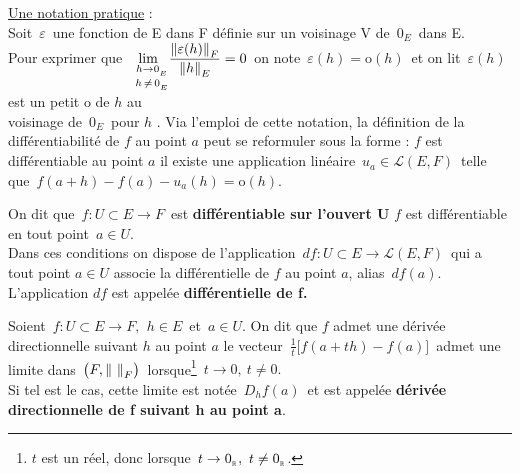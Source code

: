 \underline{Une notation pratique} : \vspace{0.2cm}\\
Soit $\,\varepsilon\,$ une fonction de E dans F définie sur un voisinage V de $\,0_E\,$ dans E.\vspace{0.1cm}\\
Pour exprimer que \(\displaystyle \lim_{\ \; \substack{\vspace{0.05cm}h\to 0_{_E} \\ h\,\neq\, 0_{_E}}}\!\frac{\norm{\varepsilon(h)}_F}{\norm{h}_E}=0\,\) on note \(\,\varepsilon(h)=\mathrm{o}(h)\,\) et on lit \guillemetleft $\,\varepsilon(h)$ est un petit o de $h$ au\vspace{0.3cm}\\
voisinage de $\,0_E\,$ pour $h\,$\guillemetright \,. Via l'emploi de cette notation, la définition de la différentiabilité de $f$ au point $a$ peut se reformuler sous la forme : $f$ est différentiable au point $a$ \ssi il existe une application linéaire \(\,u_a\in\mathscr{L}(E,F)\,\) telle que \(\,f(a+h)-f(a)-u_a(h)=\mathrm{o}(h).\)

\newpage

On dit que \(\,f:U\!\subset\! E\to F\,\) est \textbf{différentiable sur l'ouvert U} \ssi $f$ est différentiable en tout point \(\,a\in U.\)\\
Dans ces conditions on dispose de l'application \(\,df:U\!\subset\! E\to \mathscr{L}(E,F)\,\) qui a tout point $a\in U$ associe la différentielle de $f$ au point $a$, alias \(\,df(a).\)\\
L'application $df$ est appelée \textbf{différentielle de f.}

\vspace{1.5cm}

Soient \(\,f:U\subset E\to F,\ \, h\in E\,\) et \(\,a\in U.\) On dit que $f$ admet une dérivée directionnelle suivant $h$ au point $a$ \ssi le vecteur \(\,\displaystyle\frac{1}{t}\bigl[f(a+th)-f(a)\bigr]\,\) admet une limite dans \(\,\bigl(F,\norm{\ }_F\bigr)\,\) lorsque\footnote{$t$ est un réel, donc lorsque \(\,t\to 0_{_\RR},\ t\neq 0_{_\RR}\).} \(\,t\to 0,\ t\neq 0.\)\vspace{0.1cm}\\
Si tel est le cas, cette limite est notée \(\,D_hf(a)\,\) et est appelée \textbf{dérivée directionnelle de f suivant h au point a}.

\vspace{1.5cm}

